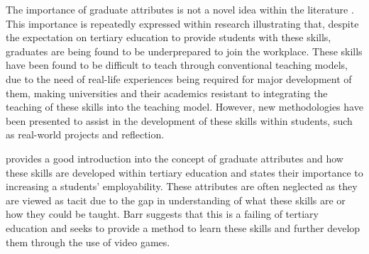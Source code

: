 \documentclass{l4proj}
\begin{document}
The importance of graduate attributes is not a novel idea 
within the literature \citep{barr_2019}. This importance is repeatedly expressed within research illustrating
that, despite the expectation on tertiary education to provide students with these skills, graduates 
are being found to be underprepared to join the workplace. These skills have been found to be 
difficult to teach through conventional teaching models, due to the need of real-life experiences 
being required for major development of them, making universities and their academics resistant to 
integrating the teaching of these skills into the teaching model. However, new methodologies have 
been presented to assist in the development of these skills within students, such as real-world 
projects and reflection.
\par  
\citet{barr_2019} provides a good introduction into the concept of graduate attributes and 
how these skills are developed within tertiary education and states their importance to increasing 
a students’ employability. These attributes are often neglected as they are viewed as tacit due to the gap in 
understanding of what these skills are or how they could be taught. Barr suggests that this is a 
failing of tertiary education and seeks to provide a method to learn these skills and further develop 
them through the use of video games. 
\end{document}
